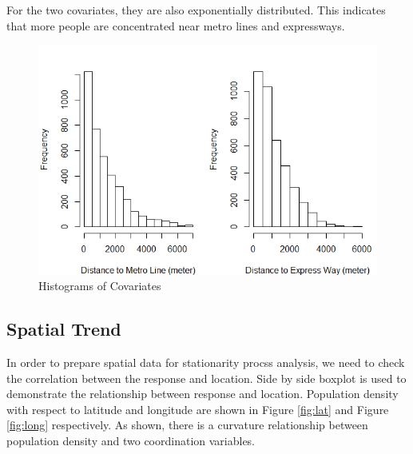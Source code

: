 \documentclass[hidelinks,12pt]{article}
\begin{document}
	For the two covariates, they are also exponentially distributed. This indicates that more people are concentrated near metro lines and expressways.
	\begin{figure}[!ht]
		\includegraphics[width=\textwidth]{hist_x.png}
		\caption{Histograms of Covariates \label{fig:histx}}
	\end{figure}
\FloatBarrier

	\subsection{Spatial Trend}\label{sec:spatialtrend}
	
	In order to prepare spatial data for stationarity procss analysis, we need to check the correlation between the response and location. Side by side boxplot is used to demonstrate the relationship between response and location. Population density with respect to latitude and longitude are shown in Figure \ref{fig:lat} and Figure \ref{fig:long} respectively. As shown, there is a curvature relationship between population density and two coordination variables.	\\
	
\end{document}
